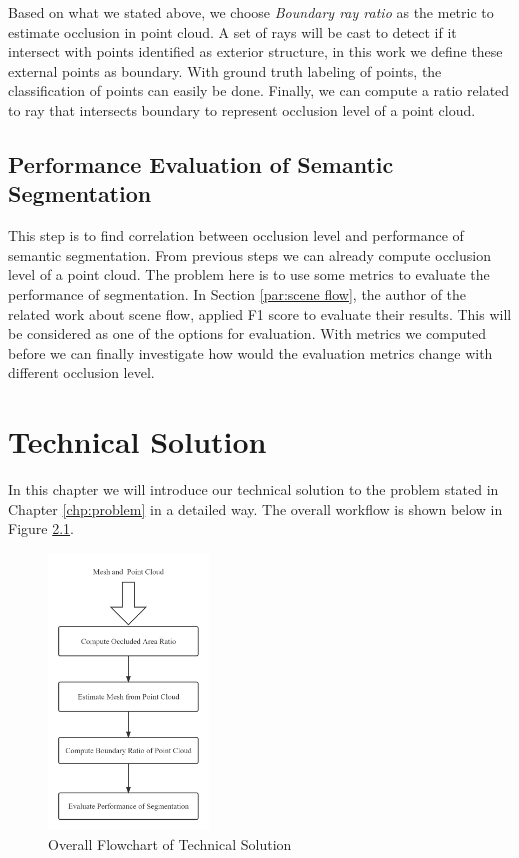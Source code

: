 \documentclass[11pt, a4paper,oneside,chapterprefix=false]{scrbook}
\begin{document}
\vspace{10pt}

Based on what we stated above, we choose \emph{Boundary ray ratio} as the metric to estimate occlusion in point cloud. A set of rays will be cast to detect if it intersect with points identified as exterior structure, in this work we define these external points as boundary. With ground truth labeling of points, the classification of points can easily be done. Finally, we can compute a ratio related to ray that intersects boundary to represent occlusion level of a point cloud. 

\section{Performance Evaluation of Semantic Segmentation} \label{sec:performance evaluation}

This step is to find correlation between occlusion level and performance of semantic segmentation. From previous steps we can already compute occlusion level of a point cloud. The problem here is to use some metrics to evaluate the performance of segmentation. In Section \ref{par:scene flow}, the author of the related work about scene flow, applied F1 score to evaluate their results. This will be considered as one of the options for evaluation. With metrics we computed before we can finally investigate how would the evaluation metrics change with different occlusion level. 

\chapter{Technical Solution} \label{chp:solution}

In this chapter we will introduce our technical solution to the problem stated in Chapter \ref{chp:problem} in a detailed way. The overall workflow is shown below in Figure \ref{fig:overall flowchart of technical solution}.

\begin{figure}[H]
    \centering
    \includegraphics*[width=0.38\textwidth]{figures/technical solution flowchart.png}
    \caption{Overall Flowchart of Technical Solution}
    \label{fig:overall flowchart of technical solution}
\end{figure}
\end{document}
